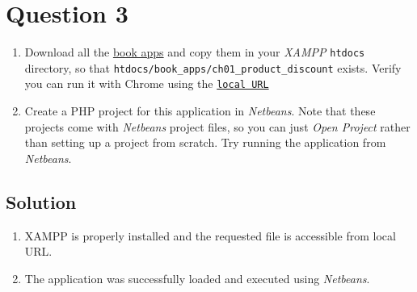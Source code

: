 
\section*{Question 3}

\begin{enumerate}[label=(\alph*)]
\item Download all the \href{http://murach.com/downloads/php2.htm}{book apps} and copy them in your \textit{XAMPP} \texttt{htdocs} directory, so that \texttt{htdocs/book\_apps/ch01\_product\_discount} exists. Verify you can run it with Chrome using the \href{http://localhost/book\_apps/ch01\_product\_discount/}{\texttt{local URL}}

\item Create a PHP project for this application in \textit{Netbeans}. Note that these projects come with \textit{Netbeans} project files, so you can just \textit{Open Project} rather than setting up a project from scratch. Try running the application from \textit{Netbeans}.

\end{enumerate}

\subsection*{Solution}

\begin{enumerate}[label=(\alph*)]
\item XAMPP is properly installed and the requested file is accessible from local URL.

\item The application was successfully loaded and executed using \textit{Netbeans}.
\end{enumerate}

